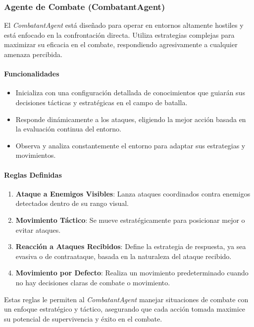 \documentclass[11pt]{article}
\begin{document}
\subsubsection{Agente de Combate (CombatantAgent)}
El \textit{CombatantAgent} está diseñado para operar en entornos altamente hostiles y está enfocado en la confrontación directa. Utiliza estrategias complejas para maximizar su eficacia en el combate, respondiendo agresivamente a cualquier amenaza percibida.

\paragraph{Funcionalidades}
\begin{itemize}
    \item Inicializa con una configuración detallada de conocimientos que guiarán sus decisiones tácticas y estratégicas en el campo de batalla.
    \item Responde dinámicamente a los ataques, eligiendo la mejor acción basada en la evaluación continua del entorno.
    \item Observa y analiza constantemente el entorno para adaptar sus estrategias y movimientos.
\end{itemize}

\paragraph{Reglas Definidas}
\begin{enumerate}
    \item \textbf{Ataque a Enemigos Visibles}: Lanza ataques coordinados contra enemigos detectados dentro de su rango visual.
    \item \textbf{Movimiento Táctico}: Se mueve estratégicamente para posicionar mejor o evitar ataques.
    \item \textbf{Reacción a Ataques Recibidos}: Define la estrategia de respuesta, ya sea evasiva o de contraataque, basada en la naturaleza del ataque recibido.
    \item \textbf{Movimiento por Defecto}: Realiza un movimiento predeterminado cuando no hay decisiones claras de combate o movimiento.
\end{enumerate}

Estas reglas le permiten al \textit{CombatantAgent} manejar situaciones de combate con un enfoque estratégico y táctico, asegurando que cada acción tomada maximice su potencial de supervivencia y éxito en el combate.
\end{document}
